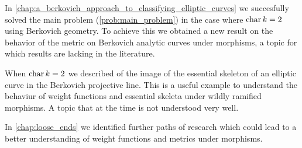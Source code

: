 In \cref{chap:a_berkovich_approach_to_classifying_elliptic_curves} we succesfully solved the main problem (\cref{prob:main_problem}) in the case where $\operatorname{char} k = 2$ using Berkovich geometry. 
To achieve this we obtained a new result on the behavior of the metric on Berkovich analytic curves under morphisms, a topic for which results are lacking in the literature. 

When $\operatorname{char} k = 2$ we described of the image of the essential skeleton of an elliptic curve in the Berkovich projective line. 
This is a useful example to understand the behaviur of weight functions and essential skeleta under wildly ramified morphisms. 
A topic that at the time is not understood very well. 

In \cref{chap:loose_ends} we identified further paths of research which could lead to a better understanding of weight functions and metrics under morphisms. 




